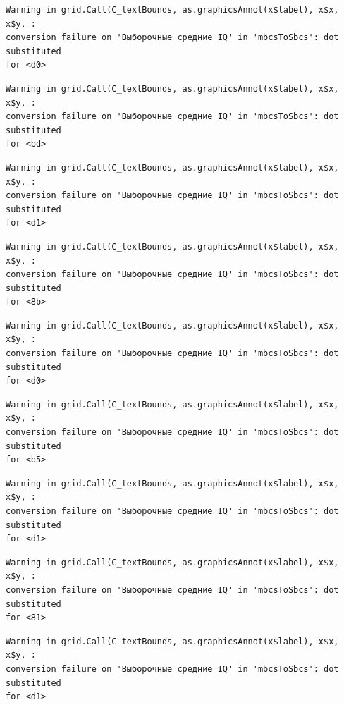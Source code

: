 \documentclass[
  letterpaper,
  DIV=11,
  numbers=noendperiod]{scrreprt}
\theoremstyle{definition}
\theoremstyle{remark}
\begin{document}
\begin{verbatim}
Warning in grid.Call(C_textBounds, as.graphicsAnnot(x$label), x$x, x$y, :
conversion failure on 'Выборочные средние IQ' in 'mbcsToSbcs': dot substituted
for <d0>
\end{verbatim}

\begin{verbatim}
Warning in grid.Call(C_textBounds, as.graphicsAnnot(x$label), x$x, x$y, :
conversion failure on 'Выборочные средние IQ' in 'mbcsToSbcs': dot substituted
for <bd>
\end{verbatim}

\begin{verbatim}
Warning in grid.Call(C_textBounds, as.graphicsAnnot(x$label), x$x, x$y, :
conversion failure on 'Выборочные средние IQ' in 'mbcsToSbcs': dot substituted
for <d1>
\end{verbatim}

\begin{verbatim}
Warning in grid.Call(C_textBounds, as.graphicsAnnot(x$label), x$x, x$y, :
conversion failure on 'Выборочные средние IQ' in 'mbcsToSbcs': dot substituted
for <8b>
\end{verbatim}

\begin{verbatim}
Warning in grid.Call(C_textBounds, as.graphicsAnnot(x$label), x$x, x$y, :
conversion failure on 'Выборочные средние IQ' in 'mbcsToSbcs': dot substituted
for <d0>
\end{verbatim}

\begin{verbatim}
Warning in grid.Call(C_textBounds, as.graphicsAnnot(x$label), x$x, x$y, :
conversion failure on 'Выборочные средние IQ' in 'mbcsToSbcs': dot substituted
for <b5>
\end{verbatim}

\begin{verbatim}
Warning in grid.Call(C_textBounds, as.graphicsAnnot(x$label), x$x, x$y, :
conversion failure on 'Выборочные средние IQ' in 'mbcsToSbcs': dot substituted
for <d1>
\end{verbatim}

\begin{verbatim}
Warning in grid.Call(C_textBounds, as.graphicsAnnot(x$label), x$x, x$y, :
conversion failure on 'Выборочные средние IQ' in 'mbcsToSbcs': dot substituted
for <81>
\end{verbatim}

\begin{verbatim}
Warning in grid.Call(C_textBounds, as.graphicsAnnot(x$label), x$x, x$y, :
conversion failure on 'Выборочные средние IQ' in 'mbcsToSbcs': dot substituted
for <d1>
\end{verbatim}
\end{document}
